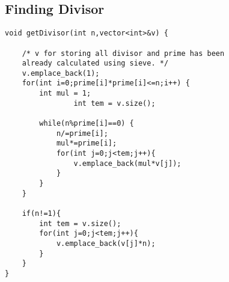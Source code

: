 \documentclass[14pt]{extarticle}
\begin{document}
\subsection{Finding Divisor}

\begin{lstlisting}
void getDivisor(int n,vector<int>&v) {

	/* v for storing all divisor and prime has been 
	already calculated using sieve. */
	v.emplace_back(1);
	for(int i=0;prime[i]*prime[i]<=n;i++) {
		int mul = 1;
                int tem = v.size();

		while(n%prime[i]==0) {
			n/=prime[i];
			mul*=prime[i];
			for(int j=0;j<tem;j++){
				v.emplace_back(mul*v[j]);
			}
		}
	}

	if(n!=1){
		int tem = v.size();
		for(int j=0;j<tem;j++){
			v.emplace_back(v[j]*n);
		}
	}
}
\end{lstlisting}
\end{document}
